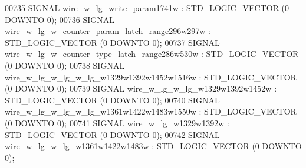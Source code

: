 \begin{DoxyCode}
{00735      \textcolor{keywordflow}{SIGNAL}  \textcolor{vhdlchar}{wire_w_lg_write_param1741w} \textcolor{vhdlchar}{:}   \textcolor{comment}{STD\_LOGIC\_VECTOR} \textcolor{vhdlchar}{(}\textcolor{vhdllogic}{}\textcolor{vhdllogic}{0} \textcolor{keywordflow}{DOWNTO} \textcolor{vhdllogic}{}\textcolor{vhdllogic}{0}\textcolor{vhdlchar}{)};
00736      \textcolor{keywordflow}{SIGNAL}  \textcolor{vhdlchar}{wire_w_lg_w_counter_param_latch_range296w297w}  \textcolor{vhdlchar}{:}   \textcolor{comment}{STD\_LOGIC\_VECTOR} \textcolor{vhdlchar}{(}\textcolor{vhdllogic}{}\textcolor{vhdllogic}{0} \textcolor{keywordflow}{DOWNTO} \textcolor{vhdllogic}{}\textcolor{vhdllogic}{0}\textcolor{vhdlchar}{)};
00737      \textcolor{keywordflow}{SIGNAL}  \textcolor{vhdlchar}{wire_w_lg_w_counter_type_latch_range286w530w}   \textcolor{vhdlchar}{:}   \textcolor{comment}{STD\_LOGIC\_VECTOR} \textcolor{vhdlchar}{(}\textcolor{vhdllogic}{}\textcolor{vhdllogic}{0} \textcolor{keywordflow}{DOWNTO} \textcolor{vhdllogic}{}\textcolor{vhdllogic}{0}\textcolor{vhdlchar}{)};
00738      \textcolor{keywordflow}{SIGNAL}  \textcolor{vhdlchar}{wire_w_lg_w_lg_w_lg_w1329w1392w1452w1516w}  \textcolor{vhdlchar}{:}   \textcolor{comment}{STD\_LOGIC\_VECTOR} \textcolor{vhdlchar}{(}\textcolor{vhdllogic}{}\textcolor{vhdllogic}{0} \textcolor{keywordflow}{DOWNTO} \textcolor{vhdllogic}{}\textcolor{vhdllogic}{0}\textcolor{vhdlchar}{)};
00739      \textcolor{keywordflow}{SIGNAL}  \textcolor{vhdlchar}{wire_w_lg_w_lg_w1329w1392w1452w}    \textcolor{vhdlchar}{:}   \textcolor{comment}{STD\_LOGIC\_VECTOR} \textcolor{vhdlchar}{(}\textcolor{vhdllogic}{}\textcolor{vhdllogic}{0} \textcolor{keywordflow}{DOWNTO} \textcolor{vhdllogic}{}\textcolor{vhdllogic}{0}\textcolor{vhdlchar}{)};
00740      \textcolor{keywordflow}{SIGNAL}  \textcolor{vhdlchar}{wire_w_lg_w_lg_w_lg_w1361w1422w1483w1550w}  \textcolor{vhdlchar}{:}   \textcolor{comment}{STD\_LOGIC\_VECTOR} \textcolor{vhdlchar}{(}\textcolor{vhdllogic}{}\textcolor{vhdllogic}{0} \textcolor{keywordflow}{DOWNTO} \textcolor{vhdllogic}{}\textcolor{vhdllogic}{0}\textcolor{vhdlchar}{)};
00741      \textcolor{keywordflow}{SIGNAL}  \textcolor{vhdlchar}{wire_w_lg_w1329w1392w}  \textcolor{vhdlchar}{:}   \textcolor{comment}{STD\_LOGIC\_VECTOR} \textcolor{vhdlchar}{(}\textcolor{vhdllogic}{}\textcolor{vhdllogic}{0} \textcolor{keywordflow}{DOWNTO} \textcolor{vhdllogic}{}\textcolor{vhdllogic}{0}\textcolor{vhdlchar}{)};
00742      \textcolor{keywordflow}{SIGNAL}  \textcolor{vhdlchar}{wire_w_lg_w_lg_w1361w1422w1483w}    \textcolor{vhdlchar}{:}   \textcolor{comment}{STD\_LOGIC\_VECTOR} \textcolor{vhdlchar}{(}\textcolor{vhdllogic}{}\textcolor{vhdllogic}{0} \textcolor{keywordflow}{DOWNTO} \textcolor{vhdllogic}{}\textcolor{vhdllogic}{0}\textcolor{vhdlchar}{)};
}
\end{DoxyCode}
